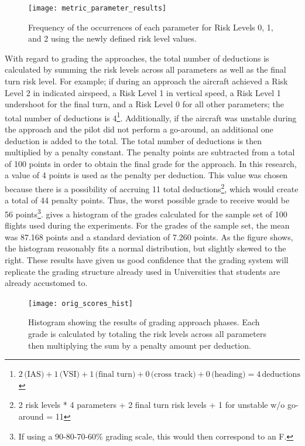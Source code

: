 	\begin{figure}
		\centering
		\texttt{[image: metric\_parameter\_results]}
		\caption{Frequency of the occurrences of each parameter for Risk Levels 0, 1, and 2 using the newly defined risk level values.}
		\label{fig:metric_parameter_results}
	\end{figure}
	
	
	With regard to grading the approaches, the total number of deductions is calculated by summing the risk levels across all parameters as well as the final turn risk level.  For example; if during an approach the aircraft achieved a Risk Level 2 in indicated airspeed, a Risk Level 1 in vertical speed, a Risk Level 1 undershoot for the final turn, and a Risk Level 0 for all other parameters; the total number of deductions is 4\footnote{$2\,\text{(IAS)} + 1\,\text{(VSI)} + 1\,\text{(final turn)} + 0\,\text{(cross track)} + 0\,\text{(heading)} = 4\,\text{deductions}$}.  Additionally, if the aircraft was unstable during the approach and the pilot did not perform a go-around, an additional one deduction is added to the total.  The total number of deductions is then multiplied by a penalty constant.  The penalty points are subtracted from a total of 100 points in order to obtain the final grade for the approach.  In this research, a value of 4 points is used as the penalty per deduction.  This value was chosen because there is a possibility of accruing 11 total deductions\footnote{2 risk levels * 4 parameters + 2 final turn risk levels + 1 for unstable w/o go-around = 11}, which would create a total of 44 penalty points.  Thus, the worst possible grade to receive would be 56 points\footnote{If using a 90-80-70-60\% grading scale, this would then correspond to an F.}.   gives a histogram of the grades calculated for the sample set of 100 flights used during the experiments.  For the grades of the sample set, the mean was 87.168 points and a standard deviation of 7.260 points.  As the figure shows, the histogram reasonably fits a normal distribution, but slightly skewed to the right.  These results have given us good confidence that the grading system will replicate the grading structure already used in Universities that students are already accustomed to.
	
	\begin{figure}
		\centering
		\texttt{[image: orig\_scores\_hist]}
		\caption{Histogram showing the results of grading approach phases.  Each grade is calculated by totaling the risk levels across all parameters then multiplying the sum by a penalty amount per deduction.}
		\label{fig:scores_hist}
	\end{figure}
        

